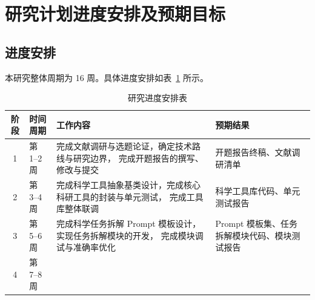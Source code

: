 \section{研究计划进度安排及预期目标}

\subsection{进度安排}

本研究整体周期为 16 周。具体进度安排如表~\ref{tab:proposal-schedule} 所示。

\begin{table}[htbp]
    \centering
    \caption{研究进度安排表}
    \label{tab:proposal-schedule}
    \begin{tabular}{clll}
        \toprule
        阶段 & 时间周期 & 工作内容 & 预期结果 \\
        \midrule
        1 & 第 1--2 周
          & \begin{minipage}[t]{0.32\textwidth}
              完成文献调研与选题论证，确定技术路线与研究边界，
              完成开题报告的撰写、修改与提交
            \end{minipage}
          & \begin{minipage}[t]{0.22\textwidth}
              开题报告终稿、文献调研清单
            \end{minipage} \\[2ex]
        2 & 第 3--4 周
          & \begin{minipage}[t]{0.32\textwidth}
              完成科学工具抽象基类设计，完成核心科研工具的封装与单元测试，
              完成工具库整体联调
            \end{minipage}
          & \begin{minipage}[t]{0.22\textwidth}
              科学工具库代码、单元测试报告
            \end{minipage} \\[2ex]
        3 & 第 5--6 周
          & \begin{minipage}[t]{0.32\textwidth}
              完成科学任务拆解 Prompt 模板设计，实现任务拆解模块的开发，
              完成模块调试与准确率优化
            \end{minipage}
          & \begin{minipage}[t]{0.22\textwidth}
              Prompt 模板集、任务拆解模块代码、模块测试报告
            \end{minipage} \\[2ex]
        4 & 第 7--8 周
          & \begin{minipage}[t]{0.32\textwidth}

\end{minipage}
\end{tabular}
\end{table}
